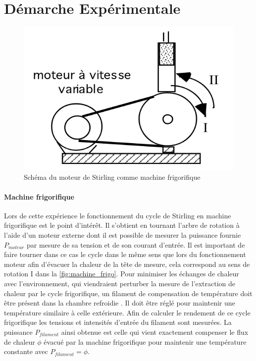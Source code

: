 \section{Démarche Expérimentale}






\begin{minipage}{\linewidth}
    \begin{figure}
        \includegraphics[width=\linewidth]{figures/machine-frigo.png}
        \caption{Schéma du moteur de Stirling comme machine frigorifique \cite{notice}}
        \label{fig:machine_frigo}
    \end{figure}

    \paragraph*{Machine frigorifique}
    Lors de cette expérience le fonctionnement du cycle de Stirling en machine frigorifique est le point d'intérêt. Il s'obtient en tournant l'arbre de rotation à l'aide d'un moteur externe dont il est possible de mesurer la puissance fournie \(P_{moteur}\) par mesure de sa tension et de son courant d'entrée. Il est important de faire tourner dans ce cas le cycle dans le même sens que lors du fonctionnement moteur afin d'évacuer la chaleur de la tête de mesure, cela correspond au sens de rotation I dans la \autoref{fig:machine_frigo}. Pour minimiser les échanges de chaleur avec l'environnement, qui viendraient perturber la mesure de l'extraction de chaleur par le cycle frigorifique, un filament de compensation de température doit être présent dans la chambre refroidie \cite{notice}. Il doit être réglé pour maintenir une température similaire à celle extérieure. Afin de calculer le rendement de ce cycle frigorifique les tensions et intensités d'entrée du filament sont mesurées. La puissance \(P_{filament}\) ainsi obtenue est celle qui vient exactement compenser le flux de chaleur \(\phi\) évacué par la machine frigorifique pour maintenir une température constante avec \(P_{filament} = \phi\).
\end{minipage}


